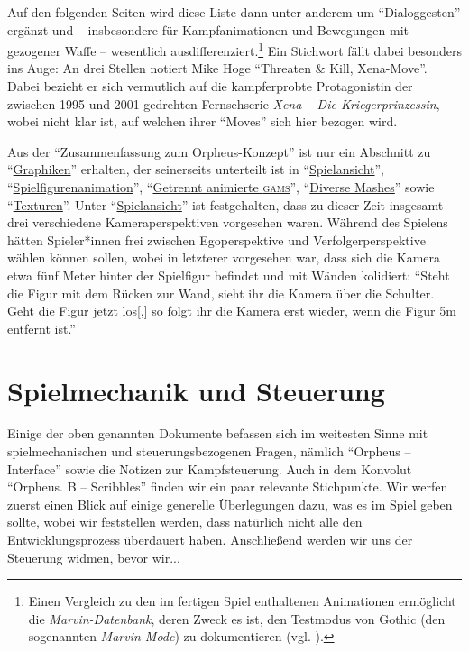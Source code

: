 \documentclass[12pt]{scrbook}
\begin{document}
Auf den folgenden Seiten wird diese Liste dann unter anderem um \enquote{Dialoggesten}\autocite[S.~4]{orpheus_bewegungen} ergänzt und -- insbesondere für Kampfanimationen und Bewegungen mit gezogener Waffe -- wesentlich ausdifferenziert.\footnote{Einen Vergleich zu den im fertigen Spiel enthaltenen Animationen ermöglicht die \textit{Marvin-Datenbank}, deren Zweck es ist, den Testmodus von Gothic (den sogenannten \textit{Marvin Mode}) zu dokumentieren (vgl. \autocite{sillus_marvin}).}
Ein Stichwort fällt dabei besonders ins Auge:
An drei Stellen notiert Mike Hoge \enquote{Threaten \& Kill, Xena-Move}.\autocite[S.~2]{orpheus_bewegungen}
Dabei bezieht er sich vermutlich auf die kampferprobte Protagonistin der zwischen 1995 und 2001 gedrehten Fernsehserie \textit{Xena -- Die Kriegerprinzessin}, wobei nicht klar ist, auf welchen ihrer \enquote{Moves} sich hier bezogen wird. %

Aus der \enquote{Zusammenfassung zum Orpheus-Konzept} ist nur ein Abschnitt zu \enquote{\uline{Graphiken}} erhalten, der seinerseits unterteilt ist in \enquote{\uline{Spielansicht}}, \enquote{\uline{Spielfigurenanimation}}, \enquote{\uline{Getrennt animierte \textsc{gams}}}, \enquote{\uline{Diverse Mashes}} sowie \enquote{\uline{Texturen}}.
Unter \enquote{\uline{Spielansicht}} ist festgehalten, dass zu dieser Zeit insgesamt drei verschiedene Kameraperspektiven vorgesehen waren.
Während des Spielens hätten Spieler*innen frei zwischen Egoperspektive und Verfolgerperspektive wählen können sollen, wobei in letzterer vorgesehen war, dass sich die Kamera etwa fünf Meter hinter der Spielfigur befindet und mit Wänden kolidiert:
\enquote{Steht die Figur mit dem Rücken zur Wand, sieht ihr die Kamera über die Schulter. Geht die Figur jetzt los[,] so folgt ihr die Kamera erst wieder, wenn die Figur 5m entfernt ist.}\autocite[S.~1]{orpheus_zusammenfassung}


\section{Spielmechanik und Steuerung}\label{sec:orpheus_mechanik}
Einige der oben genannten Dokumente befassen sich im weitesten Sinne mit spielmechanischen und steuerungsbezogenen Fragen, nämlich \enquote{Orpheus -- Interface} sowie die Notizen zur Kampfsteuerung.
Auch in dem Konvolut \enquote{Orpheus. B -- Scribbles} finden wir ein paar relevante Stichpunkte.
Wir werfen zuerst einen Blick auf einige generelle Überlegungen dazu, was es im Spiel geben sollte, wobei wir feststellen werden, dass natürlich nicht alle den Entwicklungsprozess überdauert haben.
Anschließend werden wir uns der Steuerung widmen, bevor wir...
\end{document}
